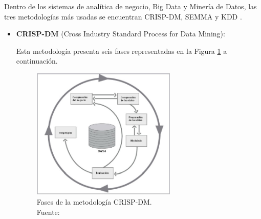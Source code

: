 Dentro de los sistemas de analítica de negocio, Big Data y Minería de Datos, las tres metodologías más usadas se encuentran CRISP-DM, SEMMA y KDD \parencite{tec_braulio2015metodologiasdm}.
\begin{itemize}
	\item \textbf{CRISP-DM} (Cross Industry Standard Process for Data Mining):
	
	Esta metodología presenta seis fases representadas en la Figura \ref{2:fig7} a continuación.
	\begin{figure}[h]
		\begin{center}
			\includegraphics[width=0.65\textwidth]{2/figures/crispdm.jpg}
			\caption[Fases de la metodología CRISP-DM]{Fases de la metodología CRISP-DM.\\
			Fuente: \cite{tec_braulio2015metodologiasdm}}
			\label{2:fig7}
		\end{center}
	\end{figure}
		

\end{itemize}

